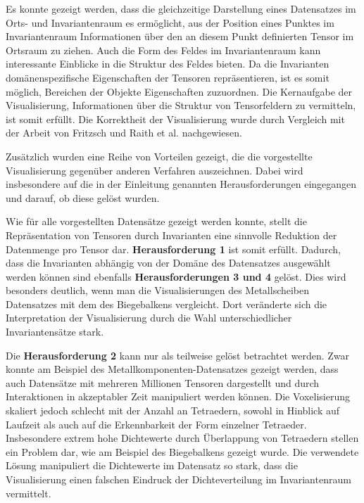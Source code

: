 \documentclass[a4paper,fontsize=12pt,toc=bib,parskip=half,ngerman]{scrartcl}
\begin{document}
Es konnte gezeigt werden, dass die gleichzeitige Darstellung eines Datensatzes im Orts- und Invariantenraum es erm\"oglicht, aus der Position eines Punktes im Invariantenraum Informationen \"uber den an diesem Punkt definierten Tensor im Ortsraum zu ziehen. Auch die Form des Feldes im Invariantenraum kann interessante Einblicke in die Struktur des Feldes bieten. Da die Invarianten dom\"anenspezifische Eigenschaften der Tensoren repr\"asentieren, ist es somit m\"oglich, Bereichen der Objekte Eigenschaften zuzuordnen. Die Kernaufgabe der Visualisierung, Informationen \"uber die Struktur von Tensorfeldern zu vermitteln, ist somit erf\"ullt. Die Korrektheit der Visualisierung wurde durch Vergleich mit der Arbeit von Fritzsch und Raith et al. nachgewiesen.

Zus\"atzlich wurden eine Reihe von Vorteilen gezeigt, die die vorgestellte Visualisierung gegen\"uber anderen Verfahren auszeichnen. Dabei wird insbesondere auf die in der Einleitung genannten Herausforderungen eingegangen und darauf, ob diese gel\"ost wurden.

Wie f\"ur alle vorgestellten Datens\"atze gezeigt werden konnte, stellt die Repr\"asentation von Tensoren durch Invarianten eine sinnvolle Reduktion der Datenmenge pro Tensor dar. \textbf{Herausforderung 1} ist somit erf\"ullt. Dadurch, dass die Invarianten abh\"angig von der Dom\"ane des Datensatzes ausgew\"ahlt werden k\"onnen sind ebenfalls \textbf{Herausforderungen 3 und 4} gel\"ost. Dies wird besonders deutlich, wenn man die Visualisierungen des Metallscheiben Datensatzes mit dem des Biegebalkens vergleicht. Dort ver\"anderte sich die Interpretation der Visualisierung durch die Wahl unterschiedlicher Invariantens\"atze stark.

Die \textbf{Herausforderung 2} kann nur als teilweise gel\"ost betrachtet werden. Zwar konnte am Beispiel des Metallkomponenten-Datensatzes gezeigt werden, dass auch Datens\"atze mit mehreren Millionen Tensoren dargestellt und durch Interaktionen in akzeptabler Zeit manipuliert werden k\"onnen. Die Voxelisierung skaliert jedoch schlecht mit der Anzahl an Tetraedern, sowohl in Hinblick auf Laufzeit als auch auf die Erkennbarkeit der Form einzelner Tetraeder. Insbesondere extrem hohe Dichtewerte durch \"Uberlappung von Tetraedern stellen ein Problem dar, wie am Beispiel des Biegebalkens gezeigt wurde. Die verwendete L\"osung manipuliert die Dichtewerte im Datensatz so stark, dass die Visualisierung einen falschen Eindruck der Dichteverteilung im Invariantenraum vermittelt.
\end{document}
